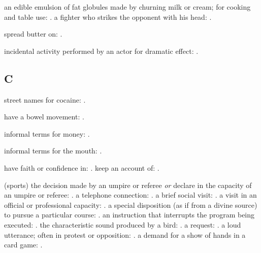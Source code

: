  an edible emulsion of fat globules made by churning milk or cream; for cooking and table use: . a fighter who strikes the opponent with his head: .

  spread butter on: .

  incidental activity performed by an actor for dramatic effect: .

\subsection*{C}

  street names for cocaine: .

  have a bowel movement: .

  informal terms for money: .

  informal terms for the mouth: .

  have faith or confidence in: . keep an account of: .

  (sports) the decision made by an umpire or referee \textit{or} declare in the capacity of an umpire or referee: . a telephone connection: . a brief social visit: . a visit in an official or professional capacity: . a special disposition (as if from a divine source) to pursue a particular course: . an instruction that interrupts the program being executed: . the characteristic sound produced by a bird: . a request: . a loud utterance; often in protest or opposition: . a demand for a show of hands in a card game:   .

